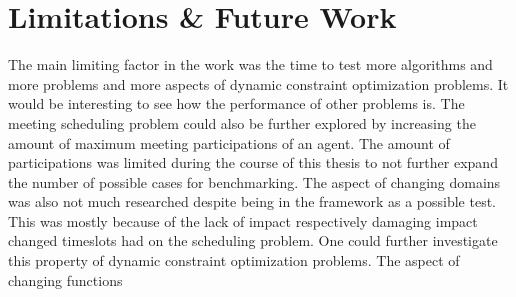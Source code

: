 \chapter{Limitations \& Future Work}
\label{c:limitations}

The main limiting factor in the work was the time to test more algorithms and more problems and more aspects of dynamic constraint optimization problems. \newline
It would be interesting to see how the performance of other problems is.
\newline
 The meeting scheduling problem could also be further explored by increasing the amount of maximum meeting participations of an agent. The amount of participations was limited during the course of this thesis to not further expand the number of possible cases for benchmarking. 
 \newline
 The aspect of changing domains was also not much researched despite being in the framework as a possible test. This was mostly because of the lack of impact respectively damaging impact changed timeslots  had on the scheduling problem. One could further investigate this property of dynamic constraint optimization problems.
\newline
The aspect of changing functions
 

 